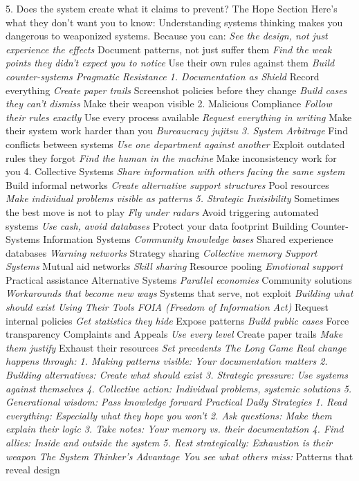 \documentclass[12pt]{book}
\begin{document}
5. Does the system create what it claims to prevent?
The Hope Section
Here's what they don't want you to know: Understanding systems thinking makes you dangerous to weaponized systems.
Because you can:
\textit{ See the design, not just experience the effects
} Document patterns, not just suffer them
\textit{ Find the weak points they didn't expect you to notice
} Use their own rules against them
\textit{ Build counter-systems
Pragmatic Resistance
1. Documentation as Shield
} Record everything
\textit{ Create paper trails
} Screenshot policies before they change
\textit{ Build cases they can't dismiss
} Make their weapon visible
2. Malicious Compliance
\textit{ Follow their rules exactly
} Use every process available
\textit{ Request everything in writing
} Make their system work harder than you
\textit{ Bureaucracy jujitsu
3. System Arbitrage
} Find conflicts between systems
\textit{ Use one department against another
} Exploit outdated rules they forgot
\textit{ Find the human in the machine
} Make inconsistency work for you
4. Collective Systems
\textit{ Share information with others facing the same system
} Build informal networks
\textit{ Create alternative support structures
} Pool resources
\textit{ Make individual problems visible as patterns
5. Strategic Invisibility
} Sometimes the best move is not to play
\textit{ Fly under radars
} Avoid triggering automated systems
\textit{ Use cash, avoid databases
} Protect your data footprint
Building Counter-Systems
Information Systems
\textit{ Community knowledge bases
} Shared experience databases
\textit{ Warning networks
} Strategy sharing
\textit{ Collective memory
Support Systems
} Mutual aid networks
\textit{ Skill sharing
} Resource pooling
\textit{ Emotional support
} Practical assistance
Alternative Systems
\textit{ Parallel economies
} Community solutions
\textit{ Workarounds that become new ways
} Systems that serve, not exploit
\textit{ Building what should exist
Using Their Tools
FOIA (Freedom of Information Act)
} Request internal policies
\textit{ Get statistics they hide
} Expose patterns
\textit{ Build public cases
} Force transparency
Complaints and Appeals
\textit{ Use every level
} Create paper trails
\textit{ Make them justify
} Exhaust their resources
\textit{ Set precedents
The Long Game
Real change happens through:
1. Making patterns visible: Your documentation matters
2. Building alternatives: Create what should exist
3. Strategic pressure: Use systems against themselves
4. Collective action: Individual problems, systemic solutions
5. Generational wisdom: Pass knowledge forward
Practical Daily Strategies
1. Read everything: Especially what they hope you won't
2. Ask questions: Make them explain their logic
3. Take notes: Your memory vs. their documentation
4. Find allies: Inside and outside the system
5. Rest strategically: Exhaustion is their weapon
The System Thinker's Advantage
You see what others miss:
} Patterns that reveal design
\end{document}
